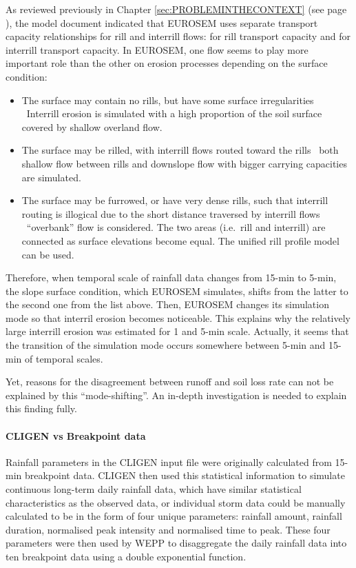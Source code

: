 As reviewed previously in Chapter \ref{sec:PROBLEMINTHECONTEXT} (see page
\pageref{sec:TransportCapacityOfTheFlow}), the model document
indicated that EUROSEM uses separate transport capacity relationships for rill
and interrill flows: \citet{govers1990-45} for rill transport capacity and
\citet{everaert1991-513} for interrill transport capacity. In EUROSEM, one flow
seems to play more important role than the other on erosion processes depending
on the surface condition:

\begin{itemize}
  \item The surface may contain no rills, but have some surface irregularities
    \subitem \textrightarrow\ Interrill erosion is simulated with a high
proportion of the soil surface covered by shallow overland flow.
  \item The surface may be rilled, with interrill flows routed toward the rills
    \subitem \textrightarrow\ both shallow flow between rills and downslope flow
with bigger carrying capacities are simulated.
  \item The surface may be furrowed, or have very dense rills, such that
interrill routing is illogical due to the short distance traversed by interrill
flows
    \subitem \textrightarrow\ ``overbank'' flow is considered. The two areas
(i.e.\ rill and interrill) are connected as surface elevations become equal. The
unified rill profile model can be used.
\end{itemize}

Therefore, when temporal scale of rainfall data changes from 15-min to 5-min,
the slope surface condition, which EUROSEM simulates, shifts from the latter to
the second one from the list above. Then, EUROSEM changes its simulation mode so
that interril erosion becomes noticeable. This explains why the relatively large
interrill erosion was estimated for 1 and 5-min scale. Actually, it seems that
the transition of the simulation mode occurs somewhere between 5-min
and 15-min of temporal scales.

Yet, reasons for the disagreement between runoff and soil loss rate can
not be explained by this ``mode-shifting''. An in-depth investigation is needed
to explain this finding fully.

\paragraph{CLIGEN vs Breakpoint data} Rainfall parameters in the CLIGEN
input file were originally calculated from 15-min breakpoint data. CLIGEN then
used this statistical information to simulate continuous long-term daily
rainfall data, which have similar statistical characteristics as the observed
data, or individual storm data could be manually calculated to be in the form of
four unique parameters: rainfall amount, rainfall duration, normalised peak
intensity and normalised time to peak. These four parameters were then used by
WEPP to disaggregate the daily rainfall data into ten breakpoint data using a
double exponential function.

